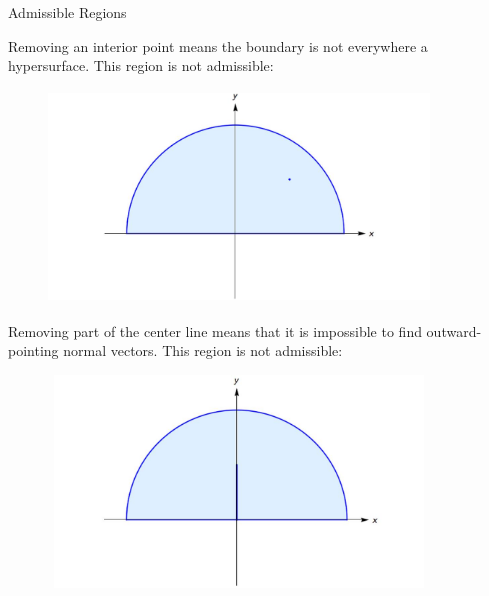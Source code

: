 \documentclass[smaller,hyperref={CJKbookmarks=true}]{beamer}
\begin{document}
\begin{frame}{Admissible Regions}
\begin{spacing}{1.1}
\begin{figure}
\end{figure}
\newpage
Removing an interior point means the boundary is not everywhere a hypersurface. This region is not admissible:
\begin{figure}
  \centering
  \includegraphics[width=0.9\textwidth,height=160pt]{77.jpg}

\end{figure}
\newpage
Removing part of the center line means that it is impossible to find outward-pointing normal vectors. This region is not admissible:
\begin{figure}
  \centering
  \includegraphics[width=0.9\textwidth,height=160pt]{78.jpg}

\end{figure}
\end{spacing}
\end{frame}
\end{document}
